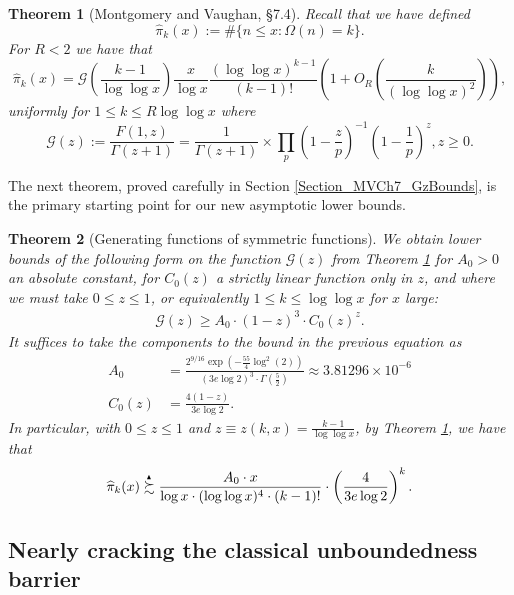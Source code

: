 \documentclass[11pt,reqno,a4letter]{article}
\numberwithin{figure}{section}
\numberwithin{table}{section}
\theoremstyle{plain}
\newtheorem{theorem}{Theorem}
\numberwithin{theorem}{section}
\theoremstyle{definition}
\newcommand{\SuccSim}[0]{\overset{_{\scriptsize{\blacktriangle}}}{\succsim}}
\begin{document}
\begin{theorem}[Montgomery and Vaughan, \S 7.4]
\label{theorem_HatPi_ExtInTermsOfGz} 
Recall that we have defined 
$$\widehat{\pi}_k(x) := \#\{n \leq x: \Omega(n)=k\}.$$ 
For $R < 2$ we have that 
\[
\widehat{\pi}_k(x) = \mathcal{G}\left(\frac{k-1}{\log\log x}\right) \frac{x}{\log x} 
     \frac{(\log\log x)^{k-1}}{(k-1)!} \left(1 + O_R\left(\frac{k}{(\log\log x)^2}\right)\right),  
\]
uniformly for $1 \leq k \leq R \log\log x$ where 
\[
\mathcal{G}(z) := \frac{F(1, z)}{\Gamma(z+1)} = \frac{1}{\Gamma(z+1)} \times 
     \prod_p \left(1-\frac{z}{p}\right)^{-1} \left(1-\frac{1}{p}\right)^z, z \geq 0. 
\]
\end{theorem} 

The next theorem, proved carefully in Section \ref{Section_MVCh7_GzBounds}, 
is the primary starting point for our new asymptotic lower bounds. 

\begin{theorem}[Generating functions of symmetric functions] 
\label{theorem_GFs_SymmFuncs_SumsOfRecipOfPowsOfPrimes} 
\label{cor_BoundsOnGz_FromMVBook_initial_stmt_v1} 
We obtain lower bounds of the following form on the function 
$\mathcal{G}(z)$ from Theorem \ref{theorem_HatPi_ExtInTermsOfGz} 
for $A_0 > 0$ an absolute constant, for 
$C_0(z)$ a strictly linear function only in $z$, and 
where we must take $0 \leq z \leq 1$, or equivalently $1 \leq k \leq \log\log x$ for $x$ large: 
\begin{align*} 
\mathcal{G}(z) \geq A_0 \cdot (1-z)^{3} \cdot C_0(z)^{z}. 
\end{align*} 
It suffices to take the components to the bound in the previous equation as 
\begin{align*}
A_0 & = \frac{2^{9/16} \exp\left(-\frac{55}{4} \log^2(2)\right)}{ 
     (3e\log 2)^3 \cdot \Gamma\left(\frac{5}{2}\right)} \approx 3.81296 \times 10^{-6} \\ 
C_0(z) & = \frac{4(1-z)}{3e \log 2}. 
\end{align*} 
In particular, with $0 \leq z \leq 1$ and 
$z \equiv z(k, x) = \frac{k-1}{\log\log x}$, by Theorem \ref{theorem_HatPi_ExtInTermsOfGz}, 
we have that 
\[
\widehat{\pi}_k(x) \SuccSim \frac{A_0 \cdot x}{\log x \cdot (\log\log x)^4 \cdot (k-1)!} \cdot 
     \left(\frac{4}{3e\log 2}\right)^{k}.
\]
\end{theorem} 

\subsection{Nearly cracking the classical unboundedness barrier} 
\end{document}
